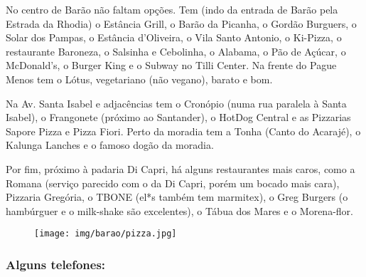 No centro de Barão não faltam opções. Tem (indo da entrada de Barão pela Estrada
da Rhodia) o Estância Grill, o Barão da Picanha, o Gordão Burguers, o Solar dos
Pampas, o Estância d'Oliveira, o Vila Santo Antonio, o Ki-Pizza, o restaurante
Baroneza, o Salsinha e Cebolinha, o Alabama, o Pão de Açúcar, o McDonald's, o
Burger King e o Subway no Tilli Center. Na frente do Pague Menos tem o Lótus,
vegetariano (não vegano), barato e bom.

Na Av.  Santa Isabel e adjacências tem o Cronópio (numa rua paralela à Santa
Isabel), o Frangonete (próximo ao Santander), o HotDog Central e as Pizzarias
Sapore Pizza e Pizza Fiori. Perto da moradia tem a Tonha (Canto do Acarajé), o
Kalunga Lanches e o famoso dogão da moradia.

Por fim, próximo à padaria Di Capri, há alguns restaurantes mais caros, como a
Romana (serviço parecido com o da Di Capri, porém um bocado mais cara), Pizzaria
Gregória, o TBONE (el*s também tem marmitex), o Greg Burgers (o hambúrguer e o
milk-shake são excelentes), o Tábua dos Mares e o Morena-flor.

\begin{figure}[h!]
    \centering
    \texttt{[image: img/barao/pizza.jpg]}
\end{figure}

\subsubsection{Alguns telefones:}

